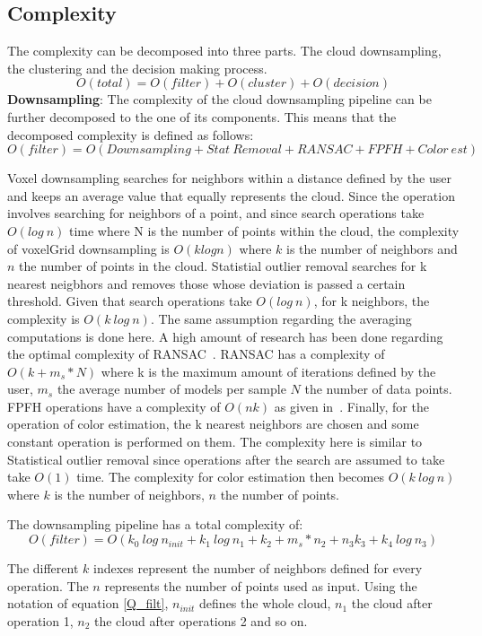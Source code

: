 \documentclass[twoside,hidelinks]{article}
\begin{document}
\subsection{Complexity}
\label{subsec:complexity}
The complexity can be decomposed into three parts. The cloud downsampling, the clustering and the decision making process.
$$
O(total) = O(filter) + O(cluster) + O(decision)
$$
\textbf{Downsampling}: The complexity of the cloud downsampling pipeline can be further decomposed to the one of its components. This means that the decomposed complexity is defined as follows:
$$O(filter) = O(Downsampling + Stat\ Removal + RANSAC+ FPFH + Color\ est) $$

Voxel downsampling searches for neighbors within a distance defined by the user and keeps an average value that equally represents the cloud. Since the operation involves searching for neighbors of a point, and since search operations take $O(log\ n)$ time where N is the number of points within the cloud, the complexity of voxelGrid downsampling is $O(k log n)$ where $k$ is the number of neighbors and $n$ the number of points in the cloud. 
Statistial outlier removal searches for k nearest neigbhors and removes those whose deviation is passed a certain threshold. Given that search operations take $O(log\ n)$, for k neighbors, the complexity is $O(k\ log\ n)$. The same assumption regarding the averaging computations is done here.
A high amount of research has been done regarding the optimal complexity of RANSAC~\cite{RANSAC}. RANSAC has a complexity of $ O(k+ m_s*N)$ where k is the maximum amount of iterations defined by the user, $m_s$ the average number of models per sample $N$ the number of data points.
FPFH operations have a complexity of $O(nk)$ as given in~\cite{fpfh}.
Finally, for the operation of color estimation, the k nearest neighbors are chosen and some constant operation is performed on them. The complexity here is similar to Statistical outlier removal since operations after the search are assumed to take take $O(1)$ time. The complexity for color estimation then becomes $O(k\ log\ n)$ where $k$ is the number of neighbors, $n$ the number of points. 

The downsampling pipeline has a total complexity of:
\begin{equation} \label{Q_filt}
O(filter) = O(k_{0}\ log\ n_{init} + k_{1}\ log\ n_{1} + k_{2}+ m_s*n_{2} + n_{3}k_{3} + k_{4}\ log\ n_{3} )
\end{equation}

The different $k$ indexes represent the number of neighbors defined for every operation. The $n$ represents the number of points used as input. Using the notation of equation \ref{Q_filt}, $n_{init}$ defines the whole cloud, $n_1$ the cloud after operation 1, $n_2$ the cloud after operations 2 and so on.
\end{document}
